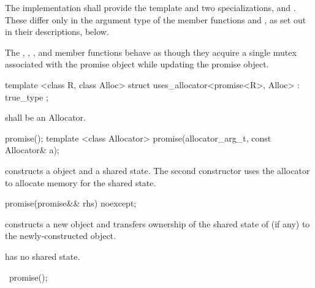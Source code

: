 \pnum
The implementation shall provide the template  and two specializations,
 and . These differ only in the argument type
of the member functions  and ,
as set out in their descriptions, below.

\pnum
The , , ,
and  member functions behave as though
they acquire a single mutex associated with the promise object while updating the
promise object.

%
\begin{itemdecl}
template <class R, class Alloc>
  struct uses_allocator<promise<R>, Alloc>
    : true_type { };
\end{itemdecl}

\begin{itemdescr}
\pnum
\requires {} shall be an Allocator.
\end{itemdescr}


%
\begin{itemdecl}
promise();
template <class Allocator>
  promise(allocator_arg_t, const Allocator& a);
\end{itemdecl}

\begin{itemdescr}
\pnum
\effects constructs a  object and a shared state. The second
constructor uses the allocator  to allocate memory for the shared
state.
\end{itemdescr}

%
\begin{itemdecl}
promise(promise&& rhs) noexcept;
\end{itemdecl}

\begin{itemdescr}
\pnum
\effects constructs a new  object and transfers ownership of the shared state
of  (if any) to the newly-constructed object.

\pnum
\postconditions {} has no shared state.
\end{itemdescr}

%
\begin{itemdecl}
~promise();
\end{itemdecl}

